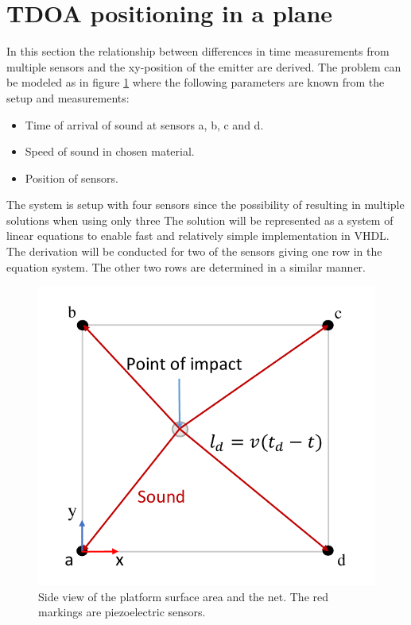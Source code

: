 \section{TDOA positioning in a plane}
\label{tdoaPositioning}
In this section the relationship between differences in time measurements from multiple sensors and the xy-position of the emitter are derived.
The problem can be modeled as in figure \ref{fig:tdoa_model} where the following parameters are known from the setup and measurements:
\begin{itemize}
	\item Time of arrival of sound at sensors a, b, c and d.
	\item Speed of sound in chosen material.
	\item Position of sensors.
\end{itemize}
The system is setup with four sensors since the possibility of resulting in multiple solutions when using only three \cite{tdoa_book}
The solution will be represented as a system of linear equations to enable fast and relatively simple implementation in VHDL.
The derivation will be conducted for two of the sensors giving one row in the equation system. The other two rows are determined in a similar manner.
\begin{figure}[htb]
	\centering
	\includegraphics[width=.6\textwidth]{figures/tdoa_model}
	\caption{Side view of the platform surface area and the net. The red markings are piezoelectric sensors.}
	\label{fig:tdoa_model}
\end{figure}

